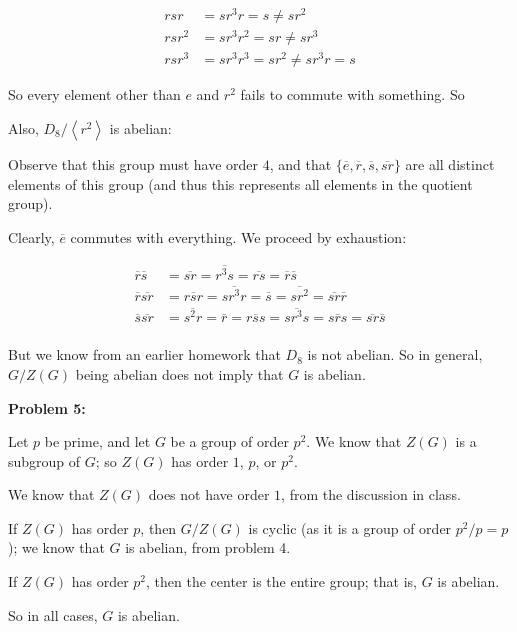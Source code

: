 \documentclass[a4paper,12pt]{article}
\newcommand{\tab}{\hspace{4mm}} %
\newcommand{\shunt}{\vspace{20mm}}
\newcommand{\anbrack}[1]{\left\langle #1 \right\rangle}
\begin{document}
\begin{align*}
rsr &= sr^3r = s \neq sr^2\\
rsr^2 &= sr^3r^2 = sr \neq sr^3 \\
rsr^3 &= sr^3r^3 = sr^2 \neq sr^3r = s
\end{align*}

\tab \tab So every element other than $e$ and $r^2$ fails to commute with something.
So 

\tab Also, $D_8/\anbrack{r^2}$ is abelian:

\tab \tab Observe that this group must have order $4$, and that $\{\overline{e},\overline{r}, \overline{s}, \overline{sr}\}$ are all distinct elements of this group (and thus this represents all elements in the quotient group).

\tab \tab Clearly, $\overline{e}$ commutes with everything. We proceed by exhaustion:

\begin{align*}
\overline{r}\overline{s} &= \overline{sr} = \overline{r^3s} = \overline{rs} = \overline{r}\overline{s}\\
\overline{r}\overline{sr} &= \overline{rsr} = \overline{sr^3r} = \overline{s} = \overline{sr^2} = \overline{sr}\overline{r}\\
\overline{s}\overline{sr} &= \overline{s^2r} = \overline{r} = \overline{rss} = \overline{sr^3s} = \overline{srs} = \overline{sr}\overline{s}\\
\end{align*}

\tab But we know from an earlier homework that $D_8$ is not abelian. So in general, $G/Z(G)$ being abelian does not imply that $G$ is abelian.

\shunt

{\bf Problem 5:}

Let $p$ be prime, and let $G$ be a group of order $p^2$. We know that $Z(G)$ is a subgroup of $G$; so $Z(G)$ has order $1$, $p$, or $p^2$.

We know that $Z(G)$ does not have order $1$, from the discussion in class.

If $Z(G)$ has order $p$, then $G/Z(G)$ is cyclic (as it is a group of order $p^2/p = p$); we know that $G$ is abelian, from problem 4. 

If $Z(G)$ has order $p^2$, then the center is the entire group; that is, $G$ is abelian.

So in all cases, $G$ is abelian.

\shunt
\end{document}
